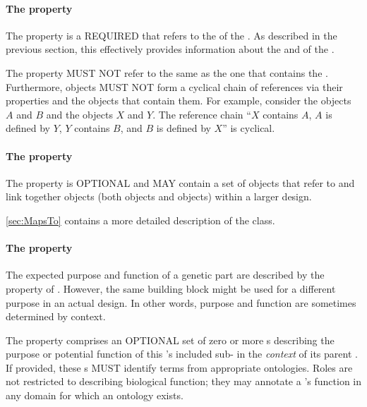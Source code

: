 \paragraph{The  property}
\label{sec:instanceOf}

The  property is a REQUIRED  that refers to the  of the .
As described in the previous section, this  effectively provides information about the  and  of the .

The  property MUST NOT refer to the same  as the one that contains the .
Furthermore,  objects MUST NOT form a cyclical chain of references via their  properties and the  objects that contain them.
For example, consider the  objects $A$ and $B$ and the  objects $X$ and $Y$. The reference chain ``$X$ contains $A$, $A$ is defined by $Y$, $Y$ contains $B$, and $B$ is defined by $X$'' is cyclical.

\paragraph{The  property}\label{sec:mapsTos:CI}

The  property is OPTIONAL and MAY contain a set of  objects that refer to and link together  objects (both  objects and  objects) within a larger design.

\ref{sec:MapsTo} contains a more detailed description of the  class.


\paragraph{The  property}\label{sec:roles:C}

The expected purpose and function of a genetic part are described by the
 property of . However, the same building block might be used for a different purpose in an actual design. In other words, purpose and function are sometimes determined by context. 

The  property comprises an OPTIONAL set of zero or more  s describing the purpose or potential function of this 's included sub- in the \textit{context} of its parent .
If provided, these  s MUST identify terms from appropriate ontologies. Roles are not restricted to describing biological function; they may annotate a 's function in any domain for which an ontology exists.


